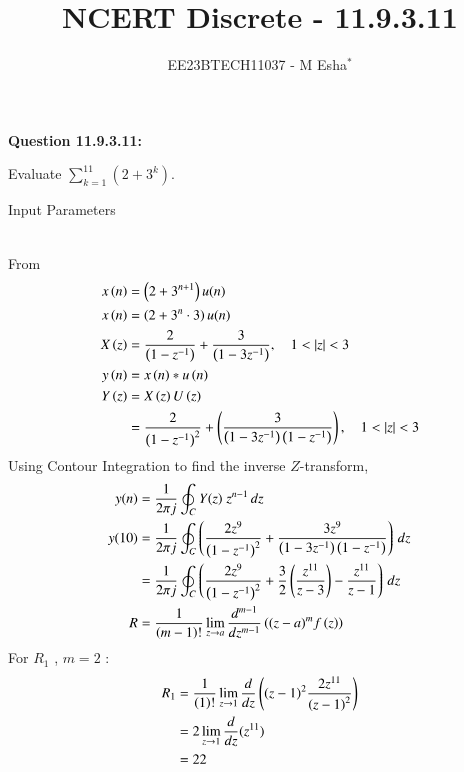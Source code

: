 \documentclass[journal,12pt,twocolumn]{IEEEtran}
\theoremstyle{remark}
\begin{document}

\vspace{3cm}

\title{NCERT Discrete - 11.9.3.11}
\author{EE23BTECH11037 - M Esha$^{*}$}

\maketitle
\newpage
\bigskip

\renewcommand{\thefigure}{\theenumi}
\renewcommand{\thetable}{\theenumi}

\vspace{3cm}
\textbf{Question 11.9.3.11:}

Evaluate $\sum_{k=1}^{11} (2 + 3^k)$.

\solution
\begin{table}[h!]
  \centering
  
  \caption{Input Parameters}
    \label{tab:table1}
\end{table}\\
From 
\begin{align}
x\left(n\right) &= \left(2+3^{n+1}\right)u(n)\\
x\left(n\right) &= \left(2+3^{n}\cdot{3}\right)u(n)\\
X\left(z\right) &= \frac{2}{\left(1-z^{-1}\right)}+\frac{3}{\left(1-3z^{-1}\right)} , \quad 1 < |z| <3\\
y\left(n\right) &= x\left(n\right)*u\left(n\right) \\
Y\left(z\right) &= X\left(z\right)U\left(z\right)\\
&=\frac{2}{\left(1-z^{-1}\right)^{2}}+\left(\frac{3}{\left(1-3z^{-1}\right)\left(1-z^{-1}\right)}\right) ,\quad 1 < |z| <3
\end{align}
 Using Contour Integration to find the inverse $Z$-transform,
\begin{align}
y(n)&=\frac{1}{2\pi j}\oint_{C}Y(z) \;z^{n-1} \,dz  \\
y(10)&=\frac{1}{2\pi j}\oint_{C}\left(\frac{2z^{9}}{\left(1-z^{-1}\right)^{2}}+\frac{3z^{9}}{\left(1-3z^{-1}\right)\left(1-z^{-1}\right)}\right) \, dz\\
&=\frac{1}{2\pi j}\oint_{C}\left(\frac{2z^{9}}{\left(1-z^{-1}\right)^{2}}+\frac{3}{2}\left(\frac{z^{11}}{z-3}\right)-\frac{z^{11}}{z-1}\right) \,dz\\
R &=\frac{1}{\left(m-1\right)!}\lim\limits_{z\to a}\frac{d^{m-1}}{dz^{m-1}}\left({(z-a)^{m}}f\left(z\right)\right)
\end{align}
For $R_1$ , $m=2$ :
\begin{align}
R_1 &=\frac{1}{\left(1\right)!}\lim\limits_{z\to 1}\frac{d}{dz}\left({\left(z-1\right)^{2}}\frac{2z^{11}}{{\left(z-1\right)^2}}\right)  \\
&=2\lim\limits_{z\to 1}\frac{d}{dz}(z^{11})   \\
&=22
\end{align}
\end{document}
